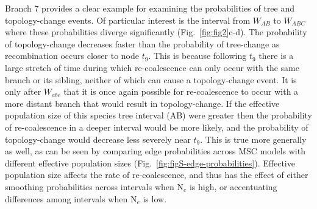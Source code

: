 \documentclass[11pt]{article}
\begin{document}
Branch 7 provides a clear example for examining the probabilities of 
tree and topology-change events. Of particular interest is the 
interval from $W_{AB}$ to $W_{ABC}$ where these probabilities diverge 
significantly (Fig.~\ref{fig:fig2}c-d). 
The probability of topology-change decreases faster than the probability of 
tree-change as recombination occurs closer to node $t_9$. This is because 
following $t_9$ there is a large stretch of time during which re-coalescence can
only occur with the same branch or its sibling, neither of which can cause a topology-change
event. It is only after $W_{abc}$ that it is once again possible for re-coalescence
to occur with a more distant branch that would result in topology-change. 
If the effective population size of this species tree interval (AB) were greater
then the probability of re-coalescence in a deeper interval would be more likely, 
and the probability of topology-change would decrease less severely near $t_9$. 
This is true more generally as well, as can be seen by comparing edge probabilities
across MSC models with different effective population sizes (Fig.~\ref{fig:figS-edge-probabilities}).
Effective population size affects the rate of re-coalescence, and thus 
has the effect of either smoothing probabilities across intervals when 
N$_e$ is high, or accentuating differences among intervals when N$_e$ is low.

\end{document}
